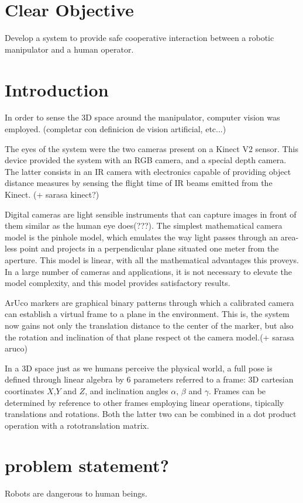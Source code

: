 \documentclass[12pt,a4paper,titlepage]{article}
\begin{document}
\section{Clear Objective}
Develop a system to provide safe cooperative interaction between a robotic manipulator and a human operator.

\section{Introduction}
In order to sense the 3D space around the manipulator, computer vision was employed. (completar con definicion de vision artificial, etc...)

The eyes of the system were the two cameras present on a Kinect V2 sensor. This device provided the system with an RGB camera, and a special depth camera. The latter consists in an IR camera with electronics capable of providing object distance measures by sensing the flight time of IR beams emitted from the Kinect. (+ sarasa kinect?)

Digital cameras are light sensible instruments that can capture images in front of them similar as the human eye does(???). The simplest mathematical camera model is the pinhole model, which emulates the way light passes through an area-less point and projects in a perpendicular plane situated one meter from the aperture. This model is linear, with all the mathematical advantages this proveys. In a large number of cameras and applications, it is not necessary to elevate the model complexity, and this model provides satisfactory results.

ArUco markers are graphical binary patterns through which a calibrated camera can establish a virtual frame to a plane in the environment. This is, the system now gains not only the translation distance to the center of the marker, but also the rotation and inclination of that plane respect ot the camera model.(+ sarasa aruco)

In a 3D space just as we humans perceive the physical world, a full pose is defined through linear algebra by 6 parameters referred to a frame: 3D cartesian coortinates $X$,$Y$ and $Z$, and inclination angles $\alpha$, $\beta$ and $\gamma$. 
Frames can be determined by reference to other frames employing linear operations, tipically translations and rotations. Both the latter two can be combined in a dot product operation with a rototranslation matrix.

\section{problem statement?}
Robots are dangerous to human beings. 
\end{document}
